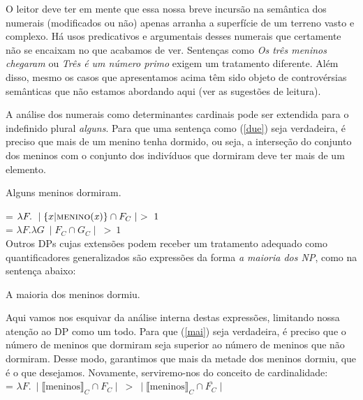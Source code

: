 O leitor deve ter em mente que essa nossa breve incursão na semântica dos numerais (modificados ou não) apenas arranha a superfície de um terreno vasto e complexo. Há usos predicativos e argumentais desses numerais que certamente não se encaixam no que acabamos de ver. Sentenças como \textit{Os três meninos chegaram} ou \textit{Três é um número primo} exigem um tratamento diferente. Além disso, mesmo os casos que apresentamos acima têm sido objeto de controvérsias semânticas que não estamos abordando aqui (ver as sugestões de leitura).


A análise dos numerais como determinantes cardinais pode ser extendida para o indefinido
plural \textit{alguns}. Para que uma sentença como (\ref{due})
seja verdadeira, é preciso que mais de um menino tenha dormido, ou
seja, a interseção do conjunto dos meninos com o conjunto dos
indivíduos que dormiram deve ter mais de um elemento.

\begin{exe}
    \ex Alguns meninos dormiram. \label{due}
\end{exe}

\n {} = $\lambda F.\ \mid
\{x | \text{\textsc{menino}(\textit{x})}\}\cap F_{C}\mid\ >\ 1$\\

\n {} = $\lambda F.\lambda G\ \mid F_{C}\cap G_{C}\mid\ >\ 1$\\


\n Outros DPs cujas extensões podem receber um tratamento adequado
como quantificadores generalizados são expressões da forma
\textit{a maioria dos NP}, como na sentença abaixo:

\begin{exe}
    \ex A maioria dos meninos dormiu. \label{mai}
\end{exe}

\n Aqui vamos nos esquivar da análise interna destas expressões,
limitando nossa atenção ao DP como um todo. Para que (\ref{mai})
seja verdadeira, é preciso que o número de meninos que dormiram
seja superior ao número de meninos que não dormiram. Desse modo,
garantimos que mais da metade dos meninos dormiu, que é o que
desejamos. Novamente, serviremo-nos do conceito de
cardinalidade:\\

\n {} = $\lambda F.\ \mid \llbracket \text{meninos} \rrbracket_{C}\cap F_{C}\mid\ >\ \mid \llbracket \text{meninos} \rrbracket_{C}\cap \overline{F_{C}}\mid $\\

